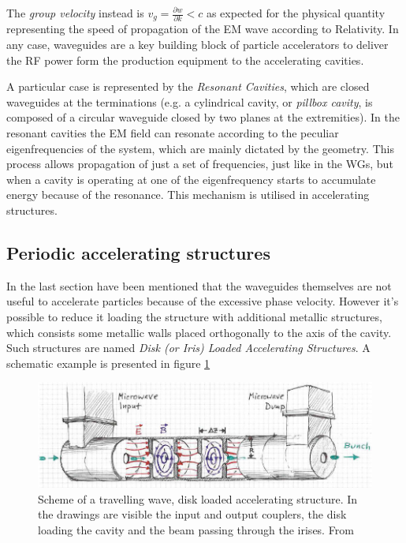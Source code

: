 The \textit{group velocity} instead is $v_g = \frac{\partial w}{\partial k} < c$ as expected for the physical quantity representing the speed of propagation of the EM wave according to Relativity. 
In any case, waveguides are a key building block of particle accelerators to deliver the RF power form the production equipment to the accelerating cavities.

A particular case is represented by the \textit{Resonant Cavities}, which are closed waveguides at the terminations (e.g. a cylindrical cavity, or \textit{pillbox cavity}, is composed of a circular waveguide closed by two planes at the extremities). In the resonant cavities the EM field can resonate according to the peculiar eigenfrequencies of the system, which are mainly dictated by the geometry. This process allows propagation of just a set of frequencies, just like in the WGs, but when a cavity is operating at one of the eigenfrequency starts to accumulate energy because of the resonance. This mechanism is utilised in accelerating structures.


\subsection[Periodic accelerating structures]{Periodic accelerating structures}

In the last section have been mentioned that the waveguides themselves are not useful to accelerate particles because of the excessive phase velocity. However it's possible to reduce it loading the structure with additional metallic structures, which consists some metallic walls placed orthogonally to the axis of the cavity.  Such structures are named \textit{Disk (or Iris) Loaded Accelerating Structures}. A schematic example is presented in figure \ref{ACS_scheme}

\begin{figure}[h]
\centering

\includegraphics[scale=0.45]{pictures/scheme_ACS}
\caption{Scheme of a travelling wave, disk loaded accelerating structure. In the drawings are visible the input and output couplers, the disk loading the cavity and the beam passing through the irises. From \cite{streun}}
\label{ACS_scheme}

\end{figure}

